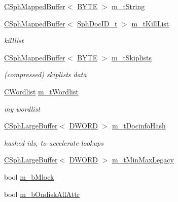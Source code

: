 \begin{DoxyCompactItemize}
\item 
\hyperlink{classCSphMappedBuffer}{C\-Sph\-Mapped\-Buffer}$<$ \hyperlink{sphinxstd_8h_a4ae1dab0fb4b072a66584546209e7d58}{B\-Y\-T\-E} $>$ \hyperlink{classCSphIndex__VLN_a20e30ba61cb53c05ffae47fc2128140b}{m\-\_\-t\-String}
\item 
\hyperlink{classCSphMappedBuffer}{C\-Sph\-Mapped\-Buffer}$<$ \hyperlink{sphinx_8h_a3176771631c12a9e4897272003e6b447}{Sph\-Doc\-I\-D\-\_\-t} $>$ \hyperlink{classCSphIndex__VLN_afb905c342ba761eeee0245909dbadbcb}{m\-\_\-t\-Kill\-List}
\begin{DoxyCompactList}\small\item\em killlist \end{DoxyCompactList}\item 
\hyperlink{classCSphMappedBuffer}{C\-Sph\-Mapped\-Buffer}$<$ \hyperlink{sphinxstd_8h_a4ae1dab0fb4b072a66584546209e7d58}{B\-Y\-T\-E} $>$ \hyperlink{classCSphIndex__VLN_a2723a67ab1986a98194e407195cfe530}{m\-\_\-t\-Skiplists}
\begin{DoxyCompactList}\small\item\em (compressed) skiplists data \end{DoxyCompactList}\item 
\hyperlink{classCWordlist}{C\-Wordlist} \hyperlink{classCSphIndex__VLN_a75a987e7fc14ef67e788828de872f475}{m\-\_\-t\-Wordlist}
\begin{DoxyCompactList}\small\item\em my wordlist \end{DoxyCompactList}\item 
\hyperlink{classCSphLargeBuffer}{C\-Sph\-Large\-Buffer}$<$ \hyperlink{sphinxstd_8h_a798af1e30bc65f319c1a246cecf59e39}{D\-W\-O\-R\-D} $>$ \hyperlink{classCSphIndex__VLN_ac9b72032d0689f4d95cb3462e04c6d2f}{m\-\_\-t\-Docinfo\-Hash}
\begin{DoxyCompactList}\small\item\em hashed ids, to accelerate lookups \end{DoxyCompactList}\item 
\hyperlink{classCSphLargeBuffer}{C\-Sph\-Large\-Buffer}$<$ \hyperlink{sphinxstd_8h_a798af1e30bc65f319c1a246cecf59e39}{D\-W\-O\-R\-D} $>$ \hyperlink{classCSphIndex__VLN_a7869e1d3943fa12418252b1a77451efb}{m\-\_\-t\-Min\-Max\-Legacy}
\item 
bool \hyperlink{classCSphIndex__VLN_a7d6c4c10d78c04e3ffbf24310cdc6952}{m\-\_\-b\-Mlock}
\item 
bool \hyperlink{classCSphIndex__VLN_a758ceff72ae0e0271c5c493b33a5a1b3}{m\-\_\-b\-Ondisk\-All\-Attr}

\end{DoxyCompactItemize}
